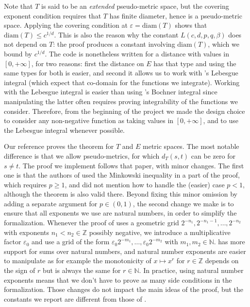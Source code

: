\documentclass[lean]{Draft}
\begin{document}
Note that $T$ is said to be an \emph{extended} pseudo-metric space, but the covering exponent condition requires that $T$ has finite diameter, hence is a pseudo-metric space.
Applying the covering condition at $\varepsilon = \mathrm{diam}(T)$ shows that $\mathrm{diam}(T) \le c^{1/d}$.
This is also the reason why the constant $L(c, d, p, q, \beta)$ does not depend on $T$: the proof produces a constant involving $\mathrm{diam}(T)$, which we bound by $c^{1/d}$.
The \Lean code is nonetheless written for a distance with values in $[0,+\infty]$, for two reasons: first the distance on $E$ has that type and using the same types for both is easier, and second it allows us to work with \mathlib's Lebesgue integral (which expect that co-domain for the functions we integrate).
Working with the Lebesgue integral is easier than using \mathlib's Bochner integral since manipulating the latter often requires proving integrability of the functions we consider.
Therefore, from the beginning of the project we made the design choice to consider any non-negative function as taking values in $[0,+\infty]$, and to use the Lebesgue integral whenever possible.

Our reference \cite{kratschmer2023kolmogorov} proves the theorem for $T$ and $E$ metric spaces.
The most notable difference is that we allow pseudo-metrics, for which $d_T(s, t)$ can be zero for $s \ne t$.
The proof we implement follows that paper, with minor changes.
The first one is that the authors of \cite{kratschmer2023kolmogorov} used the Minkowski inequality in a part of the proof, which requires $p \ge 1$, and did not mention how to handle the (easier) case $p < 1$, although the theorem is also valid there.
Beyond fixing this minor omission by adding a separate argument for $p \in (0,1)$, the second change we make is to ensure that all exponents we use are natural numbers, in order to simplify the formalization.
Whenever the proof of \cite{kratschmer2023kolmogorov} uses a geometric grid $2^{-n_1}, 2^{-n_1-1},\ldots, 2^{-n_2}$ with exponents $n_1 < n_2 \in \mathbb{Z}$ possibly negative, we introduce a multiplicative factor $\varepsilon_0$ and use a grid of the form $\varepsilon_0 2^{-m_1}, \ldots, \varepsilon_0 2^{-m_2}$ with $m_1, m_2 \in \mathbb{N}$.
\mathlib has more support for sums over natural numbers, and natural number exponents are easier to manipulate as for example the monotonicity of $x \mapsto x^r$ for $r \in \mathbb{Z}$ depends on the sign of $r$ but is always the same for $r \in \mathbb{N}$. In practice, using natural number exponents means that we don't have to prove as many side conditions in the formalization.
Those changes do not impact the main ideas of the proof, but the constants we report are different from those of \cite{kratschmer2023kolmogorov}.
\end{document}

